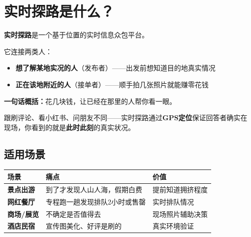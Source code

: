 \documentclass[12pt, a4paper]{article}
\begin{document}
\newpage

\section{实时探路是什么？}

\textbf{实时探路}是一个基于位置的实时信息众包平台。

它连接两类人：
\begin{itemize}[leftmargin=2em]
    \item \textbf{想了解某地实况的人}（发布者）——出发前想知道目的地真实情况
    \item \textbf{正在该地附近的人}（接单者）——顺手拍几张照片就能赚零花钱
\end{itemize}

\vspace{0.3cm}

\begin{mdframed}[style=infostyle]
\textbf{一句话概括：}花几块钱，让已经在那里的人帮你看一眼。

\vspace{6pt}
跟刷评论、看小红书、问朋友不同——实时探路通过\textbf{GPS定位}保证回答者确实在现场，你看到的就是\textbf{此时此刻}的真实状况。
\end{mdframed}

\subsection{适用场景}

\begin{table}[H]
\centering
\renewcommand{\arraystretch}{1.4}
\begin{tabularx}{\textwidth}{>{\bfseries}l X l}
\toprule
场景 & 痛点 & 价值 \\
\midrule
景点出游 & 到了才发现人山人海，假期白费 & 提前知道拥挤程度 \\
网红餐厅 & 专程跑一趟发现排队2小时或售罄 & 实时排队情况 \\
商场/展览 & 不确定是否值得去 & 现场照片辅助决策 \\
酒店民宿 & 宣传图美化、好评是刷的 & 真实环境验证 \\
\bottomrule
\end{tabularx}
\end{table}

\newpage

\end{document}
